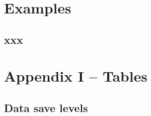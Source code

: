 \documentclass[11pt,fleqn]{book} %
\begin{document}
\cleardoublepage


\chapter{Examples}\label{ch:examples}

\hfill \break


\newpage


\section{xxx}



%

\cleardoublepage


\chapter{Appendix I -- Tables}\label{ch:appendix-i}

\hfill \break


\newpage


\section{Data save levels}
\end{document}
